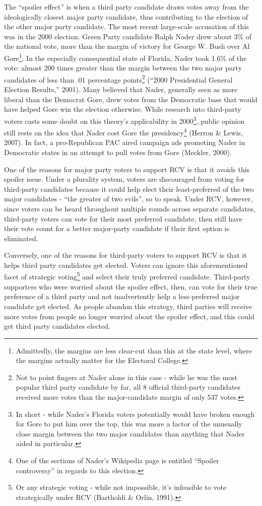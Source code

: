 \documentclass[12pt,twoside]{reedthesis}
\begin{document}
The ``spoiler effect'' is when a third party candidate draws votes away from the ideologically closest major party candidate, thus contributing to the election of the other major party candidate. The most recent large-scale accusation of this was in the 2000 election. Green Party candidate Ralph Nader drew about 3\% of the national vote, more than the margin of victory for George W. Bush over Al Gore\footnote{Admittedly, the margins are less clear-cut than this at the state level, where the margins actually matter for the Electoral College.}. In the especially consequential state of Florida, Nader took 1.6\% of the vote: almost 200 times greater than the margin between the two major party candidates of less than .01 percentage points\footnote{Not to point fingers at Nader alone in this case - while he was the most popular third party candidate by far, all 8 official third-party candidates received more votes than the major-candidate margin of only 537 votes.} (``2000 Presidential General Election Results,'' 2001). Many believed that Nader, generally seen as more liberal than the Democrat Gore, drew votes from the Democratic base that would have helped Gore win the election otherwise. While research into third-party voters casts some doubt on this theory's applicability in 2000\footnote{In short - while Nader's Florida voters potentially would have broken enough for Gore to put him over the top, this was more a factor of the unusually close margin between the two major candidates than anything that Nader aided in particular.}, public opinion still rests on the idea that Nader cost Gore the presidency\footnote{One of the sections of Nader's Wikipedia page is entitled ``Spoiler controversy'' in regards to this election.} (Herron \& Lewis, 2007). In fact, a pro-Republican PAC aired campaign ads promoting Nader in Democratic states in an attempt to pull votes from Gore (Meckler, 2000).

One of the reasons for major party voters to support RCV is that it avoids this spoiler issue. Under a plurality system, voters are discouraged from voting for third-party candidates because it could help elect their least-preferred of the two major candidates - ``the greater of two evils'', so to speak. Under RCV, however, since voters can be heard throughout multiple rounds across separate candidates, third-party voters can vote for their most preferred candidate, then still have their vote count for a better major-party candidate if their first option is eliminated.

Conversely, one of the reasons for third-party voters to support RCV is that it helps third party candidates get elected. Voters can ignore this aforementioned facet of strategic voting\footnote{Or any strategic voting - while not impossible, it's infeasible to vote strategically under RCV (Bartholdi \& Orlin, 1991).} and select their truly preferred candidate. Third-party supporters who were worried about the spoiler effect, then, can vote for their true preference of a third party and not inadvertently help a less-preferred major candidate get elected. As people abandon this strategy, third parties will receive more votes from people no longer worried about the spoiler effect, and this could get third party candidates elected.
\end{document}
